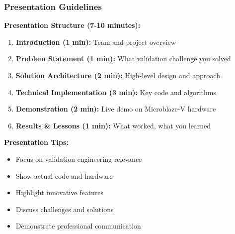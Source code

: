\documentclass{beamer}
\begin{document}
\begin{frame}
\frametitle{Presentation Guidelines}
\small \textbf{Presentation Structure (7-10 minutes):}
\begin{enumerate}
    \item \footnotesize \textbf{Introduction (1 min):} Team and project overview
    \item \footnotesize \textbf{Problem Statement (1 min):} What validation challenge you solved
    \item \footnotesize \textbf{Solution Architecture (2 min):} High-level design and approach
    \item \footnotesize \textbf{Technical Implementation (3 min):} Key code and algorithms
    \item \footnotesize \textbf{Demonstration (2 min):} Live demo on Microblaze-V hardware
    \item \footnotesize \textbf{Results \& Lessons (1 min):} What worked, what you learned
\end{enumerate}

\vspace{0.5cm}
\small \textbf{Presentation Tips:}
\begin{itemize}
    \item \footnotesize Focus on validation engineering relevance
    \item \footnotesize Show actual code and hardware
    \item \footnotesize Highlight innovative features
    \item \footnotesize Discuss challenges and solutions
    \item \footnotesize Demonstrate professional communication
\end{itemize}
\end{frame}
\end{document}

